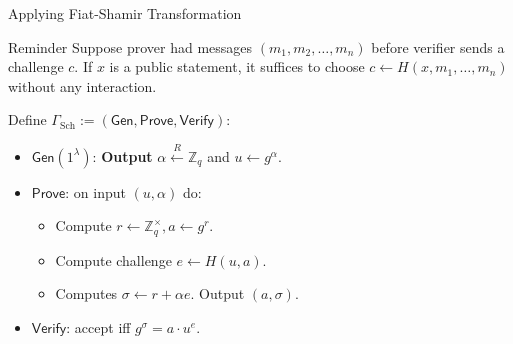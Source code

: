 \documentclass{zkdl-presentation-template}
\begin{document}
    \begin{frame}{Applying Fiat-Shamir Transformation}
        \begin{block}{Reminder}
            Suppose prover had messages $(m_1,m_2,\dots,m_n)$ before verifier sends a challenge $c$. If $x$ is a public statement, it suffices to choose $c \gets H(x,m_1,\dots,m_n)$ without any interaction.
        \end{block}

        \begin{definition}
            Define $\Gamma_{\text{Sch}} := (\mathsf{Gen}, \mathsf{Prove}, \mathsf{Verify})$:
            \begin{itemize}
                \item $\mathsf{Gen}(1^{\lambda})$: \textbf{Output} $\alpha \xleftarrow{R} \mathbb{Z}_q$ and $u \gets g^{\alpha}$.
                \item $\mathsf{Prove}$: on input $(u,\alpha)$ do:
                \begin{itemize}
                    \item Compute $r \gets \mathbb{Z}_q^{\times}, a \gets g^{r}$.
                    \item Compute challenge $e \gets H(u, a)$.
                    \item Computes $\sigma \gets r + \alpha e$. Output $(a,\sigma)$.
                \end{itemize}
                \item $\mathsf{Verify}$: accept iff $g^{\sigma} = a \cdot u^e$.
            \end{itemize}
        \end{definition}
    \end{frame}
\end{document}
